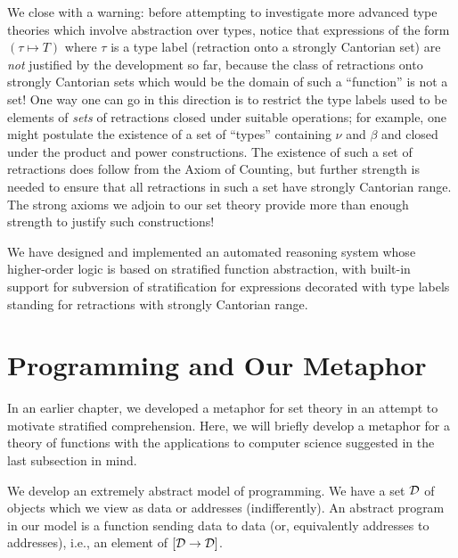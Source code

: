 We close with a warning: before attempting to investigate more
advanced type theories which involve abstraction
over types, notice 
that expressions of the form $(\tau \mapsto T)$ where $\tau$ is a type label
(retraction onto a strongly Cantorian set) are
{\em not\/} justified by the 
development so far, because the class of retractions onto
strongly 
Cantorian sets which would be the domain of such a
``function'' is not 
a set!  One way one can go in this direction is to restrict the type
labels used to be elements of {\em sets\/} of retractions closed under
suitable operations; for example, one might postulate the existence of
a set of ``types'' containing $\nu$ and $\beta$ and closed under the
product and power constructions.  The existence of such a set of
retractions does follow from the Axiom of Counting,
but further 
strength is needed to ensure that all retractions in such a set have
strongly Cantorian range.  The strong axioms we adjoin to our set
theory provide more than enough strength to justify such
constructions!

We have designed and implemented an automated reasoning system whose
higher-order logic is based on stratified
function abstraction, with 
built-in support for subversion of
stratification for expressions decorated 
with type labels standing for retractions with strongly
Cantorian 
range.



\section{Programming and Our Metaphor}

In an earlier chapter, we developed a metaphor for set theory in an
attempt to motivate stratified
comprehension.  Here, we will briefly 
develop a metaphor for a theory of functions with the
applications to 
computer science suggested in the last subsection in mind.

We develop an extremely abstract model of programming.  We have a set
$\cal D$ of objects which we view as data or addresses
(indifferently).  An abstract program in our model is a function
sending data to data (or, equivalently addresses to addresses), i.e.,
an element of $[{\cal D} \rightarrow {\cal D}]$.

